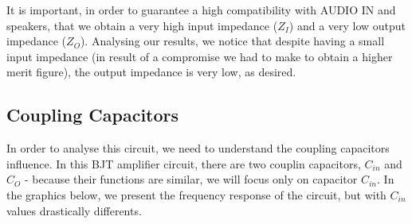 It is important, in order to guarantee a high compatibility with AUDIO IN and speakers, that we obtain a very high input impedance ($Z_I$) and a very low output impedance ($Z_O$). Analysing our results, we notice that despite having a small input impedance (in result of a compromise we had to make to obtain a higher merit figure), the output impedance is very low, as desired.




\subsection{Coupling Capacitors}
In order to analyse this circuit, we need to understand the coupling capacitors influence. In this BJT amplifier circuit, there are two couplin capacitors, $C_{in}$ and $C_O$ - because their functions are similar, we will focus only on capacitor $C_{in}$. In the graphics below, we present the frequency response of the circuit, but with $C_{in}$ values drastically differents.


